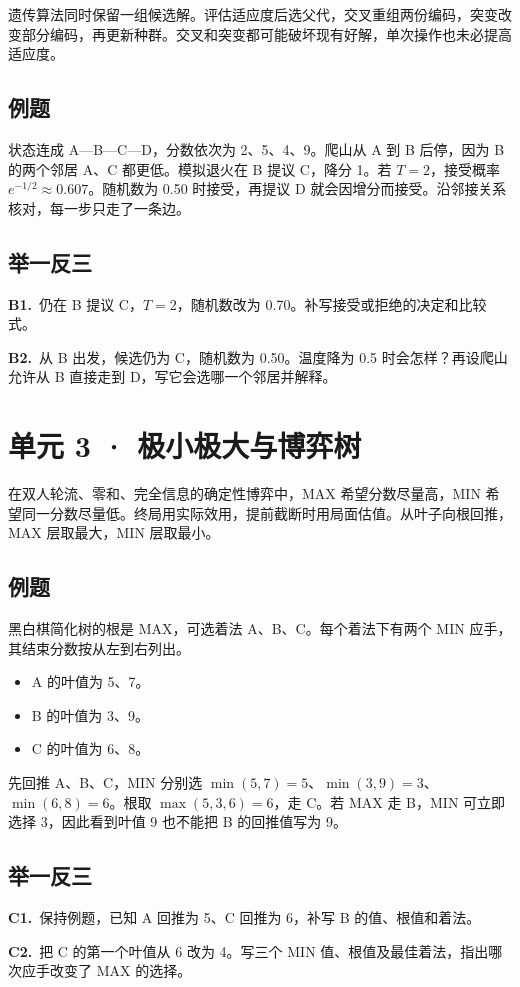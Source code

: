 \documentclass[UTF8,a4paper,11pt]{ctexart}
\newcommand{\PracticeQuestion}[3]{\par\Needspace{4\baselineskip}\noindent\begin{minipage}{\linewidth}\textbf{#1.}\ #2\par\noindent\rule{0pt}{#3mm}\par\end{minipage}\par}
\begin{document}
遗传算法同时保留一组候选解。评估适应度后选父代，交叉重组两份编码，突变改变部分编码，再更新种群。交叉和突变都可能破坏现有好解，单次操作也未必提高适应度。

\subsection{例题}
状态连成 A—B—C—D，分数依次为 2、5、4、9。爬山从 A 到 B 后停，因为 B 的两个邻居 A、C 都更低。模拟退火在 B 提议 C，降分 1。若 $T=2$，接受概率 $e^{-1/2}\approx0.607$。随机数为 0.50 时接受，再提议 D 就会因增分而接受。沿邻接关系核对，每一步只走了一条边。

\subsection{举一反三}
\PracticeQuestion{B1}{仍在 B 提议 C，$T=2$，随机数改为 0.70。补写接受或拒绝的决定和比较式。}{24}
\PracticeQuestion{B2}{从 B 出发，候选仍为 C，随机数为 0.50。温度降为 0.5 时会怎样？再设爬山允许从 B 直接走到 D，写它会选哪一个邻居并解释。}{34}
\clearpage
\section{单元 3 · 极小极大与博弈树}
在双人轮流、零和、完全信息的确定性博弈中，MAX 希望分数尽量高，MIN 希望同一分数尽量低。终局用实际效用，提前截断时用局面估值。从叶子向根回推，MAX 层取最大，MIN 层取最小。

\subsection{例题}
黑白棋简化树的根是 MAX，可选着法 A、B、C。每个着法下有两个 MIN 应手，其结束分数按从左到右列出。

\begin{itemize}
\item A 的叶值为 5、7。
\item B 的叶值为 3、9。
\item C 的叶值为 6、8。
\end{itemize}
先回推 A、B、C，MIN 分别选 $\min(5,7)=5$、$\min(3,9)=3$、$\min(6,8)=6$。根取 $\max(5,3,6)=6$，走 C。若 MAX 走 B，MIN 可立即选择 3，因此看到叶值 9 也不能把 B 的回推值写为 9。

\subsection{举一反三}
\PracticeQuestion{C1}{保持例题，已知 A 回推为 5、C 回推为 6，补写 B 的值、根值和着法。}{27}
\PracticeQuestion{C2}{把 C 的第一个叶值从 6 改为 4。写三个 MIN 值、根值及最佳着法，指出哪次应手改变了 MAX 的选择。}{35}
\clearpage
\end{document}
